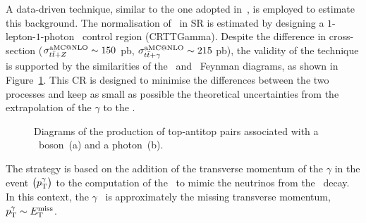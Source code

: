 		A data-driven technique, similar to the one adopted in~\cite{stop1L}, is employed to estimate this background. The normalisation of \ttZ\ in \ac{SR} is estimated by designing a $1$-lepton-$1$-photon \ttgamma\ control region (CRTTGamma). Despite the difference in cross-section ($\sigma_{t\bar{t}+Z}^{\mathrm{aMC@NLO}} \sim 150$ pb, $\sigma_{t\bar{t}+\gamma}^{\mathrm{aMC@NLO}} \sim 215$ pb), the validity of the technique is supported by the similarities of the \ttZ\ and \ttgamma\ Feynman diagrams, as shown in Figure~\ref{fig:ttZttGamma}. This \ac{CR} is designed to minimise the differences between the two processes and keep as small as possible the theoretical uncertainties from the extrapolation of the $\gamma$ to the \Zboson. 

		\begin{figure}[htpb]
		  \centering
		    \caption{Diagrams of the production of top-antitop pairs associated with a \Zboson\ boson~(a) and a photon~(b).}
		    \label{fig:ttZttGamma}
		\end{figure}

		The strategy is based on the addition of the transverse momentum of the $\gamma$ in the event $\left(p_{\mathrm{T}}^{\gamma}\right)$ to the computation of the \met\ to mimic the neutrinos from the \Zboson\ decay. In this context, the $\gamma$ \pt\ is approximately the missing transverse momentum, $p_{\mathrm{T}}^{\gamma} \sim E_{\mathrm{T}}^{\mathrm{miss}}$. 

